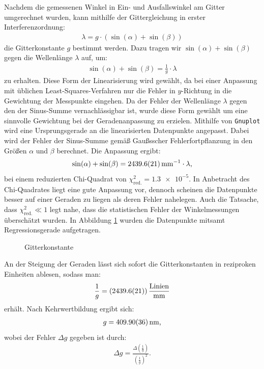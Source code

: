 \documentclass[11pt, a4paper]{article}
\numberwithin{equation}{section}
\begin{document}
Nachdem die gemessenen Winkel in Ein- und Ausfallswinkel am Gitter umgerechnet wurden, kann mithilfe der Gittergleichung in erster Interferenzordnung:
\begin{align}
	\lambda = g \cdot (\sin(\alpha) + \sin(\beta))
\end{align}
die Gitterkonstante $g$ bestimmt werden.
Dazu tragen wir $\sin(\alpha) + \sin(\beta)$ gegen die Wellenlänge $\lambda$ auf, um:
\begin{align*}
\sin(\alpha) + \sin(\beta) = \frac{1}{g} \cdot \lambda
\end{align*}
zu erhalten.
Diese Form der Linearisierung wird gewählt, da bei einer Anpassung mit üblichen Least-Squares-Verfahren nur die Fehler in $y$-Richtung in die Gewichtung der Messpunkte eingehen.
Da der Fehler der Wellenlänge $\lambda$ gegen den der Sinus-Summe vernachlässigbar ist, wurde diese Form gewählt um eine sinnvolle Gewichtung bei der Geradenanpassung zu erzielen.
Mithilfe von \texttt{Gnuplot} wird eine Ursprungsgerade an die linearisierten Datenpunkte angepasst.
Dabei wird der Fehler der Sinus-Summe gemäß Gaußsscher Fehlerfortpflanzung in den Größen $\alpha$ und $\beta$ berechnet.
Die Anpassung ergibt:
\begin{align}
	\sin(\alpha) + \sin(\beta) = \SI{2439.6 +- 2.1}{\per\milli\metre} \cdot \lambda \text{,}
\end{align}
bei einem reduzierten Chi-Quadrat von $\chi_\mathrm{red.}^2 = \num{1.3e-5}$.
In Anbetracht des Chi-Quadrates liegt eine gute Anpassung vor, dennoch scheinen die Datenpunkte besser auf einer Geraden zu liegen als deren Fehler nahelegen.
Auch die Tatsache, dass $\chi_\mathrm{red.}^2 \ll 1$ legt nahe, dass die statistischen Fehler der Winkelmessungen überschätzt wurden.
In Abbildung \ref{fig:gitterkonstante} wurden die Datenpunkte mitsamt Regressionsgerade aufgetragen.
\begin{figure}[h]
	\centering
	
	\caption{Gitterkonstante}
	\label{fig:gitterkonstante}
\end{figure}
An der Steigung der Geraden lässt sich sofort die Gitterkonstanten in reziproken Einheiten ablesen, sodass man:
\begin{align*}
	\frac{1}{g} = (\num{2439.6 +- 2.1}) \, \frac{\mathrm{Linien}}{\si{\milli\metre}}
\end{align*}
erhält. Nach Kehrwertbildung ergibt sich:
\begin{align*}
	g = \SI{409.90 +- 0.36}{\nano\metre} \text{,}
\end{align*}
wobei der Fehler $\Delta g$ gegeben ist durch:
\begin{align*}
	\Delta g = \frac{\Delta \left( \frac{1}{g} \right)}{\left( \frac{1}{g} \right)^2} \text{.}
\end{align*}
\end{document}
